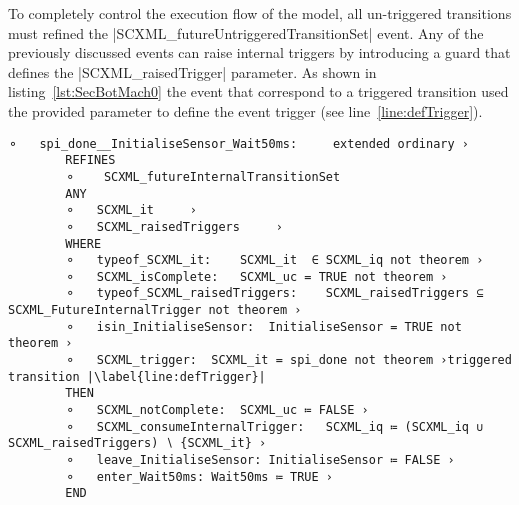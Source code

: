 To completely control the execution flow of the model, all un-triggered transitions must refined the |SCXML_futureUntriggeredTransitionSet|
event. Any of the previously discussed events can raise internal triggers by introducing a guard that defines the |SCXML_raisedTrigger| parameter. As shown in listing~\ref{lst:SecBotMach0} the event that correspond to a triggered transition used the provided parameter to define the event trigger (see line~\ref{line:defTrigger}).


\begin{lstlisting}[caption={Event-B event corresponding to internal triggered transition to \textbf{Wait50ms} state in refinement level 1 shown in~\ref{fig:ASIC}}, label={lst:SecBotMach0},language=Event-B, escapechar=|, frame=single]
	⚬	spi_done__InitialiseSensor_Wait50ms:	 extended ordinary ›
		REFINES
		⚬	 SCXML_futureInternalTransitionSet 
		ANY
		⚬	SCXML_it	 ›
		⚬	SCXML_raisedTriggers	 ›
		WHERE
		⚬	typeof_SCXML_it:	SCXML_it  ∈ SCXML_iq not theorem ›
		⚬	SCXML_isComplete:	SCXML_uc = TRUE not theorem ›
		⚬	typeof_SCXML_raisedTriggers:	SCXML_raisedTriggers ⊆ SCXML_FutureInternalTrigger not theorem ›
		⚬	isin_InitialiseSensor:	InitialiseSensor = TRUE not theorem ›
		⚬	SCXML_trigger:	SCXML_it = spi_done not theorem ›triggered transition |\label{line:defTrigger}|
		THEN
		⚬	SCXML_notComplete:	SCXML_uc ≔ FALSE ›
		⚬	SCXML_consumeInternalTrigger:	SCXML_iq ≔ (SCXML_iq ∪ SCXML_raisedTriggers) ∖ {SCXML_it} ›
		⚬	leave_InitialiseSensor:	InitialiseSensor ≔ FALSE ›
		⚬	enter_Wait50ms:	Wait50ms ≔ TRUE ›
		END
\end{lstlisting}